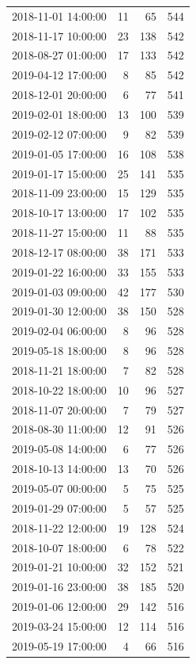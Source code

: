\begin{tabular}{lrrr}
2018-11-01 14:00:00 & 11 & 65 & 544 \\
2018-11-17 10:00:00 & 23 & 138 & 542 \\
2018-08-27 01:00:00 & 17 & 133 & 542 \\
2019-04-12 17:00:00 & 8 & 85 & 542 \\
2018-12-01 20:00:00 & 6 & 77 & 541 \\
2019-02-01 18:00:00 & 13 & 100 & 539 \\
2019-02-12 07:00:00 & 9 & 82 & 539 \\
2019-01-05 17:00:00 & 16 & 108 & 538 \\
2019-01-17 15:00:00 & 25 & 141 & 535 \\
2018-11-09 23:00:00 & 15 & 129 & 535 \\
2018-10-17 13:00:00 & 17 & 102 & 535 \\
2018-11-27 15:00:00 & 11 & 88 & 535 \\
2018-12-17 08:00:00 & 38 & 171 & 533 \\
2019-01-22 16:00:00 & 33 & 155 & 533 \\
2019-01-03 09:00:00 & 42 & 177 & 530 \\
2019-01-30 12:00:00 & 38 & 150 & 528 \\
2019-02-04 06:00:00 & 8 & 96 & 528 \\
2019-05-18 18:00:00 & 8 & 96 & 528 \\
2018-11-21 18:00:00 & 7 & 82 & 528 \\
2018-10-22 18:00:00 & 10 & 96 & 527 \\
2018-11-07 20:00:00 & 7 & 79 & 527 \\
2018-08-30 11:00:00 & 12 & 91 & 526 \\
2019-05-08 14:00:00 & 6 & 77 & 526 \\
2018-10-13 14:00:00 & 13 & 70 & 526 \\
2019-05-07 00:00:00 & 5 & 75 & 525 \\
2019-01-29 07:00:00 & 5 & 57 & 525 \\
2018-11-22 12:00:00 & 19 & 128 & 524 \\
2018-10-07 18:00:00 & 6 & 78 & 522 \\
2019-01-21 10:00:00 & 32 & 152 & 521 \\
2019-01-16 23:00:00 & 38 & 185 & 520 \\
2019-01-06 12:00:00 & 29 & 142 & 516 \\
2019-03-24 15:00:00 & 12 & 114 & 516 \\
2019-05-19 17:00:00 & 4 & 66 & 516 \\

\end{tabular}
